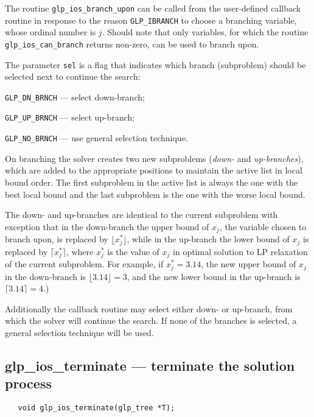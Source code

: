 \description

The routine \verb|glp_ios_branch_upon| can be called from the
user-defined callback routine in response to the reason
\verb|GLP_IBRANCH| to choose a branching variable, whose ordinal number
\linebreak is $j$. Should note that only variables, for which the
routine \verb|glp_ios_can_branch| returns non-zero, can be used to
branch upon.

The parameter \verb|sel| is a flag that indicates which branch
(subproblem) should be selected next to continue the search:

\verb|GLP_DN_BRNCH| --- select down-branch;

\verb|GLP_UP_BRNCH| --- select up-branch;

\verb|GLP_NO_BRNCH| --- use general selection technique.

\newpage


On branching the solver creates two new subproblems ({\it down-} and
{\it up-branches}), which are added to the appropriate positions to
maintain the active list in local bound order. The first subproblem in
the active list is always the one with the best local bound and the last
subproblem is the one with the worse local bound.

The down- and up-branches are identical to the current subproblem with
exception that in the down-branch the upper bound of $x_j$, the variable
chosen to branch upon, is replaced by $\lfloor x_j^*\rfloor$, while in
the up-branch the lower bound of $x_j$ is replaced by
$\lceil x_j^*\rceil$, where $x_j^*$ is the value of $x_j$ in optimal
solution to LP relaxation of the current subproblem. For example, if
$x_j^*=3.14$, the new upper bound of $x_j$ in the down-branch is
$\lfloor 3.14\rfloor=3$, and the new lower bound in the up-branch is
$\lceil 3.14\rceil=4$.)

Additionally the callback routine may select either down- or up-branch,
from which the solver will continue the search. If none of the branches
is selected, a general selection technique will be used.

\subsection{glp\_ios\_terminate --- terminate the solution process}

\synopsis

\begin{verbatim}
   void glp_ios_terminate(glp_tree *T);
\end{verbatim}

